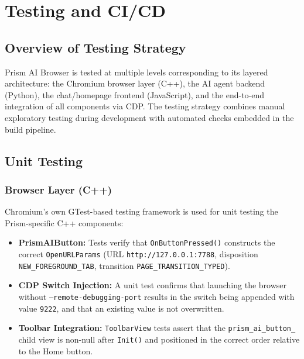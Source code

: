 \chapter{Testing and CI/CD}

\section{Overview of Testing Strategy}
Prism AI Browser is tested at multiple levels corresponding to its layered architecture: the Chromium browser layer (C++), the AI agent backend (Python), the chat/homepage frontend (JavaScript), and the end-to-end integration of all components via CDP. The testing strategy combines manual exploratory testing during development with automated checks embedded in the build pipeline.

\section{Unit Testing}

\subsection{Browser Layer (C++)}
Chromium's own GTest-based testing framework is used for unit testing the Prism-specific C++ components:
\begin{itemize}[leftmargin=*]
    \item \textbf{PrismAIButton:} Tests verify that \texttt{OnButtonPressed()} constructs the correct \texttt{OpenURLParams} (URL \texttt{http://127.0.0.1:7788}, disposition \texttt{NEW\_FOREGROUND\_TAB}, transition \texttt{PAGE\_TRANSITION\_TYPED}).
    \item \textbf{CDP Switch Injection:} A unit test confirms that launching the browser without \texttt{--remote-debugging-port} results in the switch being appended with value \texttt{9222}, and that an existing value is not overwritten.
    \item \textbf{Toolbar Integration:} \texttt{ToolbarView} tests assert that the \texttt{prism\_ai\_button\_} child view is non-null after \texttt{Init()} and positioned in the correct order relative to the Home button.
\end{itemize}

